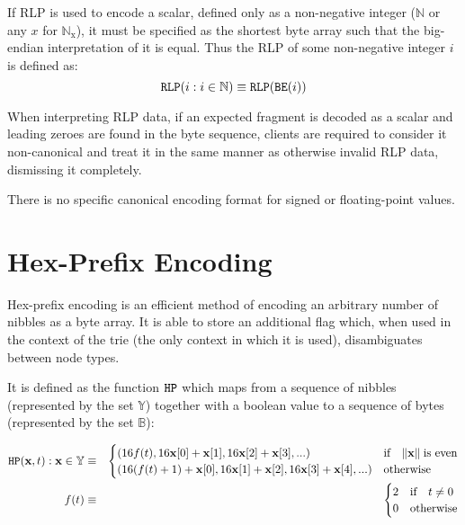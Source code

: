 \documentclass[9pt,oneside]{amsart}
\begin{document}
If RLP is used to encode a scalar, defined only as a non-negative integer ($\mathbb{N}$ or any $x$ for $\mathbb{N}_{\mathrm{x}}$), it must be specified as the shortest byte array such that the big-endian interpretation of it is equal. Thus the RLP of some non-negative integer $i$ is defined as:
\begin{equation}
\mathtt{\tiny RLP}(i : i \in \mathbb{N}) \equiv \mathtt{\tiny RLP}(\mathtt{\tiny BE}(i))
\end{equation}

When interpreting RLP data, if an expected fragment is decoded as a scalar and leading zeroes are found in the byte sequence, clients are required to consider it non-canonical and treat it in the same manner as otherwise invalid RLP data, dismissing it completely.

There is no specific canonical encoding format for signed or floating-point values.

\section{Hex-Prefix Encoding}\label{app:hexprefix}
Hex-prefix encoding is an efficient method of encoding an arbitrary number of nibbles as a byte array. It is able to store an additional flag which, when used in the context of the trie (the only context in which it is used), disambiguates between node types.

It is defined as the function $\mathtt{\tiny HP}$ which maps from a sequence of nibbles (represented by the set $\mathbb{Y}$) together with a boolean value to a sequence of bytes (represented by the set $\mathbb{B}$):

\begin{eqnarray}
\mathtt{\tiny HP}(\mathbf{x}, t): \mathbf{x} \in \mathbb{Y} & \equiv & \begin{cases}
(16f(t), 16\mathbf{x}[0] + \mathbf{x}[1], 16\mathbf{x}[2] + \mathbf{x}[3], ...) &
\text{if} \quad \lVert \mathbf{x} \rVert \; \text{is even} \\
(16(f(t) + 1) + \mathbf{x}[0], 16\mathbf{x}[1] + \mathbf{x}[2], 16\mathbf{x}[3] + \mathbf{x}[4], ...) &
\text{otherwise}
\end{cases} \\
f(t) & \equiv & \begin{cases} 2 & \text{if} \quad t \neq 0 \\ 0 & \text{otherwise} \end{cases}
\end{eqnarray}
\end{document}
